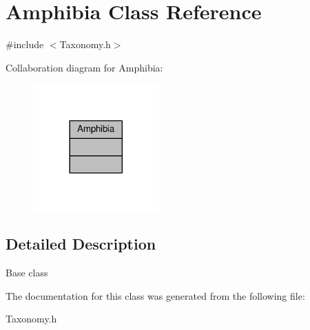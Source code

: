 \hypertarget{classAmphibia}{}\section{Amphibia Class Reference}
\label{classAmphibia}


{\ttfamily \#include $<$Taxonomy.\+h$>$}



Collaboration diagram for Amphibia\+:
\nopagebreak
\begin{figure}[H]
\begin{center}
\leavevmode
\includegraphics[width=137pt]{classAmphibia__coll__graph}
\end{center}
\end{figure}


\subsection{Detailed Description}
Base class 

The documentation for this class was generated from the following file\+:\begin{DoxyCompactItemize}
\item 
Taxonomy.\+h\end{DoxyCompactItemize}
